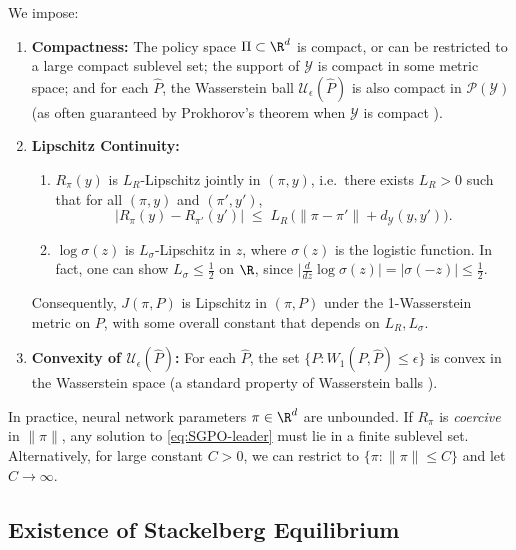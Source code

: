 \begin{assumption}
\label{assump:main}
We impose:
\begin{enumerate}[leftmargin=1.6em,label=(\roman*)]
  \item \textbf{Compactness:} The policy space $\Pi\subset \R^d$ is compact, or can be restricted to a large compact sublevel set; the support of $\mathcal{Y}$ is compact in some metric space; and for each $\hat{P}$, the Wasserstein ball $\mathcal{U}_\epsilon(\hat{P})$ is also compact in $\mathcal{P}(\mathcal{Y})$ (as often guaranteed by Prokhorov’s theorem when $\mathcal{Y}$ is compact \cite{billingsley1999convergence}).
  \item \textbf{Lipschitz Continuity:}
    \begin{enumerate}
       \item $R_\pi(y)$ is $L_R$-Lipschitz jointly in $(\pi,y)$, i.e.\ there exists $L_R>0$ such that for all $(\pi,y)$ and $(\pi',y')$,
       \[
       |R_\pi(y) - R_{\pi'}(y')|\;\le\;L_R\,\bigl(\|\pi-\pi'\| + d_{\mathcal{Y}}(y,y')\bigr).
       \]
       \item $\log\sigma(z)$ is $L_{\sigma}$-Lipschitz in $z$, where $\sigma(z)$ is the logistic function.  In fact, one can show $L_{\sigma}\leq \tfrac12$ on $\R$, since $\bigl|\tfrac{d}{dz}\log \sigma(z)\bigr| = \bigl|\sigma(-z)\bigr|\le \tfrac12$.
    \end{enumerate}
    Consequently, $J(\pi,P)$ is Lipschitz in $(\pi,P)$ under the 1-Wasserstein metric on $P$, with some overall constant that depends on $L_R, L_{\sigma}$.
  \item \textbf{Convexity of $\mathcal{U}_\epsilon(\hat{P})$:} For each $\hat{P}$, the set $\{P:W_1(P,\hat{P})\le \epsilon\}$ is convex in the Wasserstein space (a standard property of Wasserstein balls \cite{villani2003topics}).
\end{enumerate}
\end{assumption}

\begin{remark}
In practice, neural network parameters $\pi\in\R^d$ are unbounded.  If $R_\pi$ is \emph{coercive} in $\|\pi\|$, any solution to \eqref{eq:SGPO-leader} must lie in a finite sublevel set.  Alternatively, for large constant $C>0$, we can restrict to $\{\pi:\|\pi\|\le C\}$ and let $C\to\infty$.
\end{remark}

\subsection{Existence of Stackelberg Equilibrium}
\label{sec:existence}

